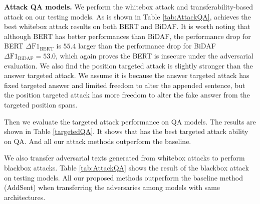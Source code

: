 \textbf{Attack QA models.} We perform the whitebox attack and transferability-based attack on our testing models. As is shown in Table \ref{tab:AttackQA}, \advcodecword achieves the best whitebox attack results on both BERT and BiDAF. It is worth noting that although BERT has better performances than BiDAF, the performance drop for BERT $\Delta \text{F1}_\text{BERT}$ is $55.4$ larger than the performance drop for BiDAF $\Delta \text{F1}_\text{BiDAF} = 53.0$, which again proves the BERT is insecure under the adversarial evaluation. We also find the position targeted attack is slightly stronger than the answer targeted attack. We assume it is because the answer targeted attack has fixed targeted answer and limited freedom to alter the appended sentence, but the position targeted attack has more freedom to alter the fake answer from the targeted position spans. 

Then we evaluate the targeted attack performance on QA models. The results are shown in Table \ref{targetedQA}. It shows that \advcodecword has the best targeted attack ability on QA. And all our attack methods outperform the baseline.

We also transfer adversarial texts generated from whitebox attacks to perform blackbox attacks. Table \ref{tab:AttackQA} shows the result of the blackbox attack on testing models. All our proposed methods outperform the baseline method (AddSent) when transferring the adversaries among models with same architectures. 




